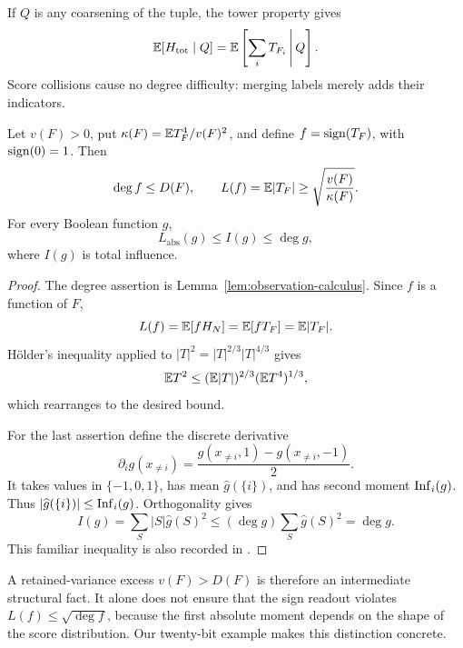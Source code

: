 If \(Q\) is any coarsening of the tuple, the tower property gives
\begin{equation}\label{eq:tower-scores}
 \mathbb E[H_{\mathrm{tot}}\mid Q]=
 \mathbb E\left[\sum_i T_{F_i}\,\middle|\,Q\right].
\end{equation}
Score collisions cause no degree difficulty: merging labels merely
adds their indicators.

\begin{lemma}
\label{lem:readout}
Let \(v(F)>0\), put \(\kappa(F)=\mathbb E T_F^4/v(F)^2\), and define
\(f=\operatorname{sign}(T_F)\), with \(\operatorname{sign}(0)=1\). Then
\[
 \deg f\le D(F),\qquad
 L(f)=\mathbb E|T_F|\ge\sqrt{\frac{v(F)}{\kappa(F)}}.
\]
For every Boolean function \(g\),
\begin{equation}\label{eq:linear-bound}
 L_{\mathrm{abs}}(g)\le I(g)\le\deg g,
\end{equation}
where \(I(g)\) is total influence.
\end{lemma}

\begin{proof}
The degree assertion is Lemma~\ref{lem:observation-calculus}. Since
\(f\) is a function of \(F\),
\[
 L(f)=\mathbb E[fH_N]=\mathbb E[fT_F]=\mathbb E|T_F|.
\]
Hölder's inequality applied to
\(|T|^2=|T|^{2/3}|T|^{4/3}\) gives
\[
 \mathbb E T^2\le(\mathbb E|T|)^{2/3}(\mathbb E T^4)^{1/3},
\]
which rearranges to the desired bound.

For the last assertion define the discrete derivative
\[
 \partial_i g(x_{\ne i})
 =\frac{g(x_{\ne i},1)-g(x_{\ne i},-1)}2.
\]
It takes values in \(\{-1,0,1\}\), has mean
\(\widehat g(\{i\})\), and has second moment \(\operatorname{Inf}_i(g)\).
Thus \(|\widehat g(\{i\})|\le\operatorname{Inf}_i(g)\).
Orthogonality gives
\[
 I(g)=\sum_S|S|\widehat g(S)^2
 \le(\deg g)\sum_S\widehat g(S)^2=\deg g.
\]
This familiar inequality is also recorded in
\cite{NisanSzegedy1994,ODonnell2012}.
\end{proof}

A retained-variance excess \(v(F)>D(F)\) is therefore an intermediate
structural fact. It alone does not ensure that the sign readout
violates \(L(f)\le\sqrt{\deg f}\), because the first absolute moment
depends on the shape of the score distribution. Our twenty-bit example
makes this distinction concrete.
